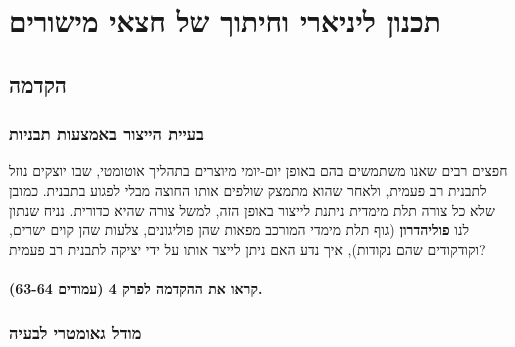 \documentclass[
]{book}
\begin{document}
\hypertarget{ux5eaux5dbux5e0ux5d5ux5df-ux5dcux5d9ux5e0ux5d9ux5d0ux5e8ux5d9-ux5d5ux5d7ux5d9ux5eaux5d5ux5da-ux5e9ux5dc-ux5d7ux5e6ux5d0ux5d9-ux5deux5d9ux5e9ux5d5ux5e8ux5d9ux5dd}{%
\chapter{תכנון ליניארי וחיתוך של חצאי מישורים}\label{ux5eaux5dbux5e0ux5d5ux5df-ux5dcux5d9ux5e0ux5d9ux5d0ux5e8ux5d9-ux5d5ux5d7ux5d9ux5eaux5d5ux5da-ux5e9ux5dc-ux5d7ux5e6ux5d0ux5d9-ux5deux5d9ux5e9ux5d5ux5e8ux5d9ux5dd}}

\hypertarget{ux5d4ux5e7ux5d3ux5deux5d4}{%
\section{הקדמה}\label{ux5d4ux5e7ux5d3ux5deux5d4}}

\hypertarget{ux5d1ux5e2ux5d9ux5d9ux5ea-ux5d4ux5d9ux5d9ux5e6ux5d5ux5e8-ux5d1ux5d0ux5deux5e6ux5e2ux5d5ux5ea-ux5eaux5d1ux5e0ux5d9ux5d5ux5ea}{%
\subsection{בעיית הייצור באמצעות תבניות}\label{ux5d1ux5e2ux5d9ux5d9ux5ea-ux5d4ux5d9ux5d9ux5e6ux5d5ux5e8-ux5d1ux5d0ux5deux5e6ux5e2ux5d5ux5ea-ux5eaux5d1ux5e0ux5d9ux5d5ux5ea}}

חפצים רבים שאנו משתמשים בהם באופן יום-יומי מיוצרים בתהליך אוטומטי, שבו יוצקים נוזל לתבנית רב פעמית, ולאחר שהוא מתמצק שולפים אותו החוצה מבלי לפגוע בתבנית. כמובן שלא כל צורה תלת מימדית ניתנת לייצור באופן הזה, למשל צורה שהיא כדורית. נניח שנתון לנו \textbf{פוליהדרון} (גוף תלת מימדי המורכב מפאות שהן פוליגונים, צלעות שהן קוים ישרים, וקודקודים שהם נקודות), איך נדע האם ניתן לייצר אותו על ידי יציקה לתבנית רב פעמית?

\hypertarget{ux5e7ux5e8ux5d0ux5d5-ux5d0ux5ea-ux5d4ux5d4ux5e7ux5d3ux5deux5d4-ux5dcux5e4ux5e8ux5e7-4-ux5e2ux5deux5d5ux5d3ux5d9ux5dd-63-64.}{%
\subsubsection*{קראו את ההקדמה לפרק 4 (עמודים 63-64).}\label{ux5e7ux5e8ux5d0ux5d5-ux5d0ux5ea-ux5d4ux5d4ux5e7ux5d3ux5deux5d4-ux5dcux5e4ux5e8ux5e7-4-ux5e2ux5deux5d5ux5d3ux5d9ux5dd-63-64.}}

\hypertarget{ux5deux5d5ux5d3ux5dc-ux5d2ux5d0ux5d5ux5deux5d8ux5e8ux5d9-ux5dcux5d1ux5e2ux5d9ux5d4}{%
\subsection{מודל גאומטרי לבעיה}\label{ux5deux5d5ux5d3ux5dc-ux5d2ux5d0ux5d5ux5deux5d8ux5e8ux5d9-ux5dcux5d1ux5e2ux5d9ux5d4}}
\end{document}
